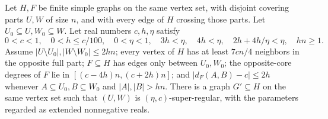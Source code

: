 \begin{lemma}
Let $H,F$ be finite simple graphs on the same vertex set, with
disjoint covering parts $U,W$ of size $n$, and with every edge of
$H$ crossing those parts. Let $U_0\subseteq U,W_0\subseteq W$.
Let real numbers $c,h,\eta$ satisfy
\[
0<c<1,\quad0<h\leq c/100,\quad0<\eta<1,\quad
3h<\eta,\quad4h<\eta,\quad2h+4h/\eta<\eta,\quad hn\geq1.
\]
Assume $|U\setminus U_0|,|W\setminus W_0|\leq2hn$;
every vertex of $H$ has at least $7cn/4$ neighbors in the opposite
full part; $F\subseteq H$ has edges only between $U_0,W_0$;
the opposite-core degrees of $F$ lie in $[(c-4h)n,(c+2h)n]$;
and $|d_F(A,B)-c|\leq2h$ whenever
$A\subseteq U_0,B\subseteq W_0$ and $|A|,|B|>hn$.
There is a graph $G'\subseteq H$ on the same vertex set such that
$(U,W)$ is $(\eta,c)$-super-regular, with the parameters regarded
as extended nonnegative reals.
\end{lemma}
